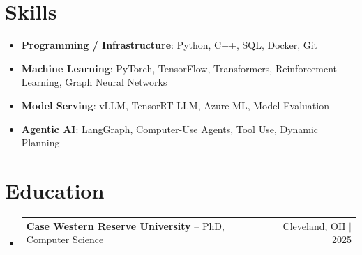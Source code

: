 \documentclass[letterpaper,13pt]{article}
\makeatletter
\newcommand{\resumeProjectHeading}[2]{
    \item
    \begin{tabular*}{\textwidth}{l@{\extracolsep{\fill}}r}
      \small#1 & #2 \\
    \end{tabular*}\vspace{-4pt}
}
\newcommand{\resumeSubHeadingListStart}{\begin{itemize}[leftmargin=0in, label={}]}
\newcommand{\resumeSubHeadingListEnd}{\end{itemize}}
\makeatother
\begin{document}
\section{Skills}
\vspace{0.02cm}
\begin{itemize}[leftmargin=0.15in, label={}, itemsep=2pt, topsep=1pt]
  \item \textbf{Programming / Infrastructure}: Python, C++, SQL, Docker, Git
  \item \textbf{Machine Learning}: PyTorch, TensorFlow, Transformers, Reinforcement Learning, Graph Neural Networks
  \item \textbf{Model Serving}: vLLM, TensorRT-LLM, Azure ML, Model Evaluation
  \item \textbf{Agentic AI}: LangGraph, Computer-Use Agents, Tool Use, Dynamic Planning
\end{itemize}
\vspace{0.02cm}

\section{Education}
\resumeSubHeadingListStart
  \resumeProjectHeading{\textbf{Case Western Reserve University} -- PhD, Computer Science}{Cleveland, OH $|$ 2025}
\resumeSubHeadingListEnd
\end{document}
